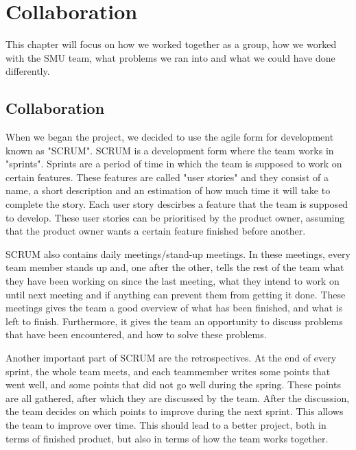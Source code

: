 \chapter{Collaboration}
This chapter will focus on how we worked together as a group, how we worked with the SMU team, what problems we ran into and what we could have done differently.

\section{Collaboration}
When we began the project, we decided to use the agile form for development known as "SCRUM". SCRUM is a development form where the team works in "sprints". Sprints are a period of time in which the team is supposed to work on certain features. These features are called "user stories" and they consist of a name, a short description and an estimation of how much time it will take to complete the story. Each user story descirbes a feature that the team is supposed to develop. These user stories can be prioritised by the product owner, assuming that the product owner wants a certain feature finished before another.

SCRUM also contains daily meetings/stand-up meetings. In these meetings, every team member stands up and, one after the other, tells the rest of the team what they have been working on since the last meeting, what they intend to work on until next meeting and if anything can prevent them from getting it done. These meetings gives the team a good overview of what has been finished, and what is left to finish. Furthermore, it gives the team an opportunity to discuss problems that have been encountered, and how to solve these problems.

Another important part of SCRUM are the retrospectives. At the end of every sprint, the whole team meets, and each teammember writes some points that went well, and some points that did not go well during the spring. These points are all gathered, after which they are discussed by the team. After the discussion, the team decides on which points to improve during the next sprint. This allows the team to improve over time. This should lead to a better project, both in terms of finished product, but also in terms of how the team works together.

